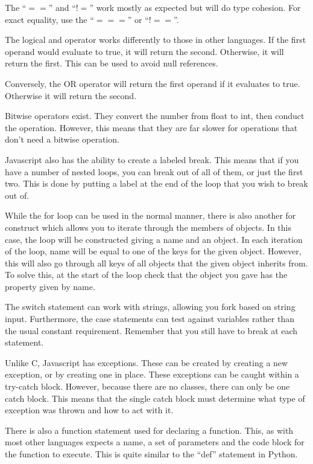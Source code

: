 			The ``$==$'' and ``$!=$'' work mostly as expected but will do type cohesion. 
			For exact equality, use the ``$===$'' or ``$!==$''. 

			The logical and operator works differently to those in other languages. 
			If the first operand would evaluate to true, it will return the second.
			Otherwise, it will return the first. 
			This can be used to avoid null references. 

			Conversely, the OR operator will return the first operand if it evaluates to true. 
			Otherwise it will return the second. 

			Bitwise operators exist. 
			They convert the number from float to int, then conduct the operation. 
			However, this means that they are far slower for operations that don't need a bitwise operation. 

			Javascript also has the ability to create a labeled break. 
			This means that if you have a number of nested loops, you can break out of all of them, or just the first two. 
			This is done by putting a label at the end of the loop that you wish to break out of. 

			While the for loop can be used in the normal manner, 
			there is also another for construct which allows you to iterate through the members of objects. 
			In this case, the loop will be constructed giving a name and an object. 
			In each iteration of the loop, name will be equal to one of the keys for the given object. 
			However, this will also go through all keys of all objects that the given object inherits from. 
			To solve this, at the start of the loop check that the object you gave has the property given by name. 

			The switch statement can work with strings, allowing you fork based on string input. 
			Furthermore, the case statements can test against variables rather than the usual constant requirement. 
			Remember that you still have to break at each statement. 

			Unlike C, Javascript has exceptions. 
			These can be created by creating a new exception, or by creating one in place. 
			These exceptions can be caught within a try-catch block. 
			However, because there are no classes, there can only be one catch block. 
			This means that the single catch block must determine what type of exception was thrown and how to act with it. 

			There is also a function statement used for declaring a function. 
			This, as with most other languages expects a name, a set of parameters and the code block for the function to execute. 
			This is quite similar to the ``def'' statement in Python. 

